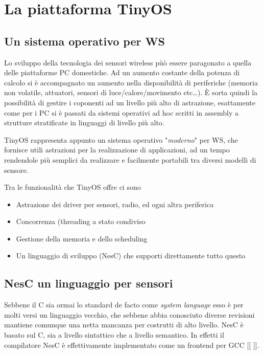 \documentclass[pdftex,12pt,a4paper,italian,openany]{book}
\begin{document}
\chapter{La piattaforma TinyOS}

\section{Un sistema operativo per WS}
Lo sviluppo della tecnologia dei sensori wireless pùò essere paragonato a quella delle 
piattaforme PC domestiche. Ad un aumento costante della potenza di calcolo si è accompagnato un 
aumento nella disponibilità di periferiche (memoria non volatile, attuatori, sensori di 
luce/calore/movimento etc\ldots). \`E sorta quindi la possibilità di gestire i coponenti ad un 
livello più alto di astrazione, esattamente come per i PC si è passati da sistemi operativi 
ad hoc scritti in assembly a strutture stratificate in linguaggi di livello più alto. 

TinyOS rappresenta appunto un sistema operativo "\emph{moderno}" per WS, che fornisce 
utili astrazioni per la realizzazione di applicazioni, ad un tempo rendendole più 
semplici da realizzare e facilmente portabili tra diversi modelli di sensore.

Tra le funzionalità che TinyOS offre ci sono
\begin{itemize}

\item{Astrazione dei driver per sensori, radio, ed ogni altra periferica  }

\item{Concorrenza (threading a stato condiviso}

\item{Gestione della memoria e dello scheduling}

\item{Un linguaggio di sviluppo (NesC) che supporti direttamente tutto questo}
\end{itemize}


\section{NesC un linguaggio per sensori}

Sebbene il C sia ormai lo standard de facto come \emph{system language} esso è per molti versi 
un linguaggio vecchio, che sebbene abbia conosciuto diverse revisioni mantiene comunque una 
netta mancanza per costrutti di alto livello. 
NesC è basato sul C, sia a livello sintattico che a livello semantico. 
In effetti il compilatore NesC è effettivamente implementato come un frontend per GCC [[ ]].
\end{document}
